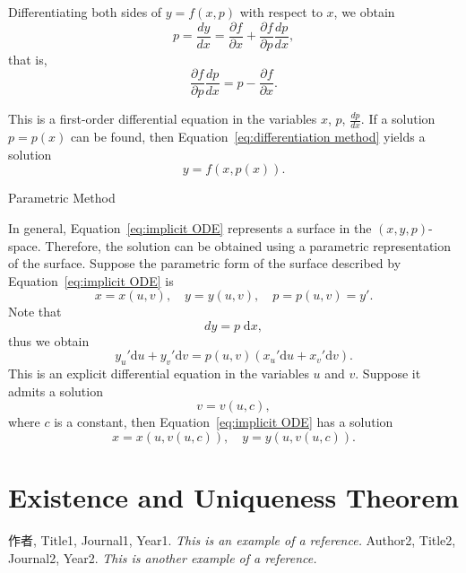 \documentclass[11pt]{elegantbook}
\begin{document}
Differentiating both sides of \(y = f(x, p)\) with respect to \(x\), we obtain
\[
p = \frac{dy}{dx} = \frac{\partial f}{\partial x} + \frac{\partial f}{\partial p} \frac{dp}{dx},
\]
that is,
\begin{equation*}
\frac{\partial f}{\partial p} \frac{dp}{dx} = p - \frac{\partial f}{\partial x}.
\end{equation*}

This is a first-order differential equation in the variables \(x\), \(p\), \(\frac{dp}{dx}\). 
If a solution \(p = p(x)\) can be found, then Equation~\eqref{eq:differentiation method} yields a solution
\[
y = f(x, p(x)).
\]
\begin{leftbarTitle}{Parametric Method}\end{leftbarTitle}
In general, Equation~\eqref{eq:implicit ODE} represents a surface in the \((x, y, p)\)-space. 
Therefore, the solution can be obtained using a parametric representation of the surface. 
Suppose the parametric form of the surface described by Equation~\eqref{eq:implicit ODE} is
\[
x = x(u, v),\quad y = y(u, v),\quad p = p(u, v) = y'.
\]
Note that
\[
dy = p \; \mathrm{d}x,
\]
thus we obtain
\[
y_u' \mathrm{d}u + y_v' \mathrm{d}v = p(u, v)(x_u' \mathrm{d}u + x_v' \mathrm{d}v).
\]
This is an explicit differential equation in the variables \(u\) and \(v\). Suppose it admits a solution
\[
v = v(u, c),
\]
where \(c\) is a constant, then Equation~\eqref{eq:implicit ODE} has a solution
\[
x = x(u, v(u, c)),\quad y = y(u, v(u, c)).
\]

\chapter{Existence and Uniqueness Theorem}




\begin{thebibliography}{99} 
 作者, Title1, Journal1, Year1. \emph{ This is an example of a reference.}
 Author2, Title2, Journal2, Year2. \emph{ This is another example of a reference.}
\end{thebibliography}
\end{document}

